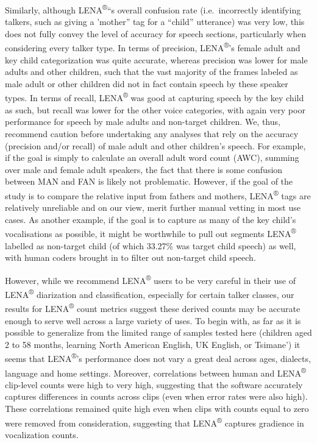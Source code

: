 \documentclass[english,table,man,floatsintext]{apa6}
\begin{document}
Similarly, although LENA\textsuperscript{®}\enquote{s overall confusion rate (i.e.~incorrectly identifying talkers, such as giving a 'mother} tag for a \enquote{child} utterance) was very low, this does not fully convey the level of accuracy for speech sections, particularly when considering every talker type. In terms of precision, LENA\textsuperscript{®}'s female adult and key child categorization was quite accurate, whereas precision was lower for male adults and other children, such that the vast majority of the frames labeled as male adult or other children did not in fact contain speech by these speaker types. In terms of recall, LENA\textsuperscript{®} was good at capturing speech by the key child as such, but recall was lower for the other voice categories, with again very poor performance for speech by male adults and non-target children. We, thus, recommend caution before undertaking any analyses that rely on the accuracy (precision and/or recall) of male adult and other children's speech. For example, if the goal is simply to calculate an overall adult word count (AWC), summing over male and female adult speakers, the fact that there is some confusion between MAN and FAN is likely not problematic. However, if the goal of the study is to compare the relative input from fathers and mothers, LENA\textsuperscript{®} tags are relatively unreliable and on our view, merit further manual vetting in most use cases. As another example, if the goal is to capture as many of the key child's vocalisations as possible, it might be worthwhile to pull out segments LENA\textsuperscript{®} labelled as non-target child (of which 33.27\% was target child speech) as well, with human coders brought in to filter out non-target child speech.

However, while we recommend LENA\textsuperscript{®} users to be very careful in their use of LENA\textsuperscript{®} diarization and classification, especially for certain talker classes, our results for LENA\textsuperscript{®} count metrics suggest these derived counts may be accurate enough to serve well across a large variety of uses. To begin with, as far as it is possible to generalize from the limited range of samples tested here (children aged 2 to 58 months, learning North American English, UK English, or Tsimane') it seems that LENA\textsuperscript{®}'s performance does not vary a great deal across ages, dialects, language and home settings. Moreover, correlations between human and LENA\textsuperscript{®} clip-level counts were high to very high, suggesting that the software accurately captures differences in counts across clips (even when error rates were also high). These correlations remained quite high even when clips with counts equal to zero were removed from consideration, suggesting that LENA\textsuperscript{®} captures gradience in vocalization counts.
\end{document}
